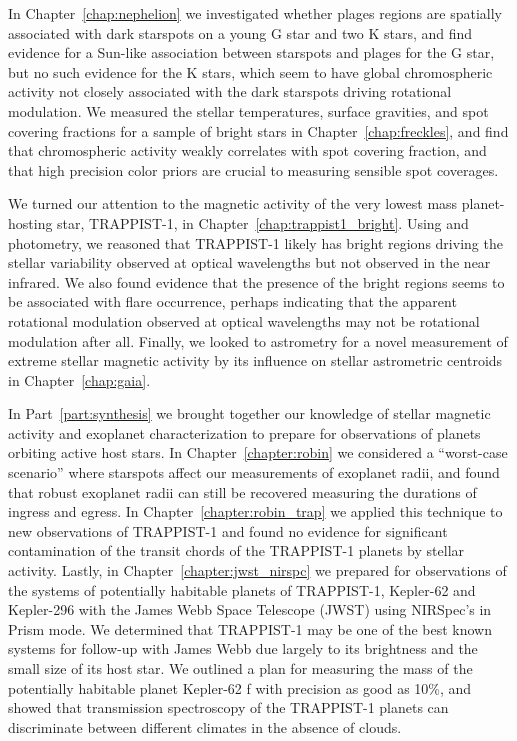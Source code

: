 In Chapter~\ref{chap:nephelion} we investigated whether plages regions are spatially associated with dark starspots on a young G star and two K stars, and find evidence for a Sun-like association between starspots and plages for the G star, but no such evidence for the K stars, which seem to have global chromospheric activity not closely associated with the dark starspots driving rotational modulation. We measured the stellar temperatures, surface gravities, and spot covering fractions for a sample of bright stars in Chapter~\ref{chap:freckles}, and find that chromospheric activity weakly correlates with spot covering fraction, and that high precision color priors are crucial to measuring sensible spot coverages. 

We turned our attention to the magnetic activity of the very lowest mass planet-hosting star, TRAPPIST-1, in Chapter~\ref{chap:trappist1_bright}. Using \kepler and \spitzer photometry, we reasoned that TRAPPIST-1 likely has bright regions driving the stellar variability observed at optical wavelengths but not observed in the near infrared. We also found evidence that the presence of the bright regions seems to be associated with flare occurrence, perhaps indicating that the apparent rotational modulation observed at optical wavelengths may not be rotational modulation after all. Finally, we looked to astrometry for a novel measurement of extreme stellar magnetic activity by its influence on stellar astrometric centroids in Chapter~\ref{chap:gaia}.  

In Part~\ref{part:synthesis} we brought together our knowledge of stellar magnetic activity and exoplanet characterization to prepare for observations of planets orbiting active host stars. In Chapter~\ref{chapter:robin} we considered a ``worst-case scenario'' where starspots affect our measurements of exoplanet radii, and found that robust exoplanet radii can still be recovered measuring the durations of ingress and egress. In Chapter~\ref{chapter:robin_trap} we applied this technique to new \spitzer observations of TRAPPIST-1 and found no evidence for significant contamination of the transit chords of the TRAPPIST-1 planets by stellar activity. Lastly, in Chapter~\ref{chapter:jwst_nirspc} we prepared for observations of the systems of potentially habitable planets of TRAPPIST-1, Kepler-62 and Kepler-296 with the James Webb Space Telescope (JWST) using NIRSpec's in Prism mode. We determined that TRAPPIST-1 may be one of the best known systems for follow-up with James Webb due largely to its brightness and the small size of its host star. We outlined a plan for measuring the mass of the potentially habitable planet Kepler-62 f with precision as good as 10\%, and showed that transmission spectroscopy of the TRAPPIST-1 planets can discriminate between different climates in the absence of clouds. 

